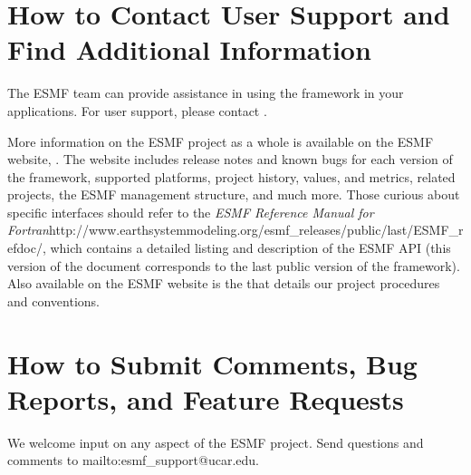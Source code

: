 \section{How to Contact User Support and Find Additional Information}
\label{sec:Support}
The ESMF team can provide assistance in using the framework in your
applications.
For user support, please contact 
.  

More information on the ESMF project as a whole is available on the 
ESMF website, .  
The website includes release notes and known bugs for each version of the
framework, supported platforms, project history, values, and metrics, related projects,
the ESMF management structure, and much more.  Those curious about specific 
interfaces should refer to the \htmladdnormallink
{{\it ESMF Reference Manual for Fortran}}{http://www.earthsystemmodeling.org/esmf_releases/public/last/ESMF\_refdoc/}, which contains a detailed listing and description of 
the ESMF API (this version of the document corresponds to the last public version of the framework).  Also available on the ESMF website is the
that details our project procedures and conventions.

\section{How to Submit Comments, Bug Reports, and Feature Requests}
\label{sec:Submission}
We welcome input on any aspect of the ESMF project.  Send
questions and comments to 
{mailto:esmf\_support@ucar.edu}.


